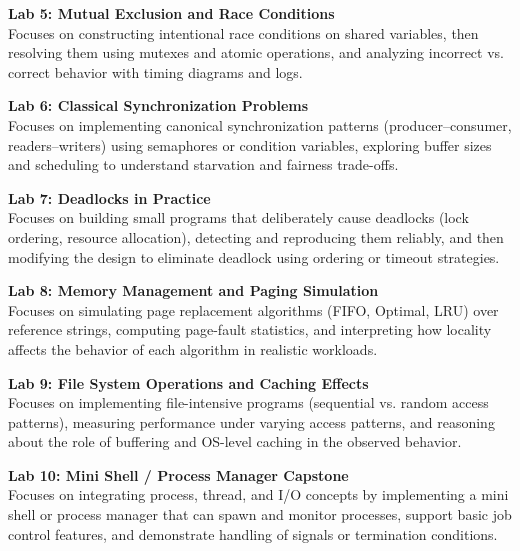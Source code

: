\vspace{0.2cm}

\noindent\textbf{Lab 5: Mutual Exclusion and Race Conditions} \\
Focuses on constructing intentional race conditions on shared variables, then resolving them using mutexes and atomic operations, and analyzing incorrect vs. correct behavior with timing diagrams and logs. \\

\vspace{0.2cm}

\noindent\textbf{Lab 6: Classical Synchronization Problems} \\
Focuses on implementing canonical synchronization patterns (producer–consumer, readers–writers) using semaphores or condition variables, exploring buffer sizes and scheduling to understand starvation and fairness trade-offs. \\

\vspace{0.2cm}

\noindent\textbf{Lab 7: Deadlocks in Practice} \\
Focuses on building small programs that deliberately cause deadlocks (lock ordering, resource allocation), detecting and reproducing them reliably, and then modifying the design to eliminate deadlock using ordering or timeout strategies. \\

\vspace{0.2cm}

\noindent\textbf{Lab 8: Memory Management and Paging Simulation} \\
Focuses on simulating page replacement algorithms (FIFO, Optimal, LRU) over reference strings, computing page-fault statistics, and interpreting how locality affects the behavior of each algorithm in realistic workloads. \\

\vspace{0.2cm}

\noindent\textbf{Lab 9: File System Operations and Caching Effects} \\
Focuses on implementing file-intensive programs (sequential vs. random access patterns), measuring performance under varying access patterns, and reasoning about the role of buffering and OS-level caching in the observed behavior. \\

\vspace{0.2cm}

\noindent\textbf{Lab 10: Mini Shell / Process Manager Capstone} \\
Focuses on integrating process, thread, and I/O concepts by implementing a mini shell or process manager that can spawn and monitor processes, support basic job control features, and demonstrate handling of signals or termination conditions.

\vspace{0.2cm}

\newpage
{}
